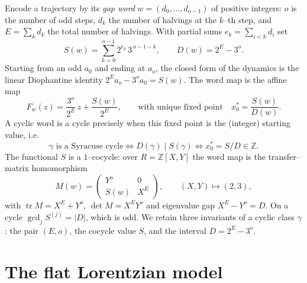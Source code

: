 \documentclass[11pt,a4paper]{article}
\theoremstyle{bourbaki}
\theoremstyle{bourbakidef}
\newcommand{\Z}{\mathbb{Z}}
\DeclareMathOperator{\tr}{tr}
\begin{document}
Encode a trajectory by its \emph{gap word} $w=(d_0,\dots,d_{o-1})$ of positive integers:
$o$ is the number of odd steps, $d_k$ the number of halvings at the $k$--th step, and
$E=\sum_k d_k$ the total number of halvings. With partial sums
$e_k=\sum_{i<k}d_i$ set
\begin{equation}\label{eq:SD}
  S(w)=\sum_{k=0}^{o-1} 2^{e_k}\,3^{\,o-1-k},
  \qquad
  D(w)=2^{E}-3^{o}.
\end{equation}
Starting from an odd $a_0$ and ending at $a_o$, the closed form of the dynamics is the
linear Diophantine identity $2^{E}a_o-3^{o}a_0=S(w)$. The word map is the affine map
\begin{equation}\label{eq:Fgamma}
  F_w(z)=\frac{3^{o}}{2^{E}}\,z+\frac{S(w)}{2^{E}},
  \qquad\text{with unique fixed point}\quad
  x_0^\ast=\frac{S(w)}{D(w)}.
\end{equation}
A cyclic word is a cycle precisely when this fixed point is the (integer) starting value,
i.e.
\begin{equation}\label{eq:cyclecond}
  \boxed{\ \gamma\text{ is a Syracuse cycle}\iff D(\gamma)\mid S(\gamma)\iff x_0^\ast=S/D\in\Z.\ }
\end{equation}
The functional $S$ is a $1$--cocycle: over $R=\Z[X,Y]$ the word map is the transfer--matrix
homomorphism
\begin{equation}\label{eq:transfer}
  M(w)=\begin{pmatrix} Y^{o} & 0\\ S(w) & X^{E}\end{pmatrix},
  \qquad (X,Y)\mapsto(2,3),
\end{equation}
with $\tr M=X^E+Y^o$, $\det M=X^EY^o$ and eigenvalue gap $X^E-Y^o=D$. On a cycle
$\gcd_j S^{(j)}=|D|$, which is odd. We retain three invariants of a cyclic class $\gamma$:
the pair $(E,o)$, the cocycle value $S$, and the interval $D=2^E-3^o$.

\section{The flat Lorentzian model}\label{sec:model}
\end{document}
